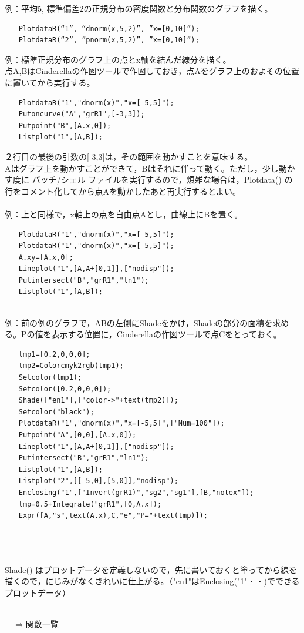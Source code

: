 \documentclass[papersize,a4paper,12pt,uplatex]{jsarticle}
\begin{document}
\begin{description}
例：平均5, 標準偏差2の正規分布の密度関数と分布関数のグラフを描く。
\begin{verbatim}
　　PlotdataR(“1”, “dnorm(x,5,2)”, ”x=[0,10]”);
　　PlotdataR(“2”, ”pnorm(x,5,2)”, ”x=[0,10]”);
\end{verbatim}

例：標準正規分布のグラフ上の点とx軸を結んだ線分を描く。\\
点A,BはCinderellaの作図ツールで作図しておき，点Aをグラフ上のおよその位置に置いてから実行する。
\begin{verbatim}
　　PlotdataR("1","dnorm(x)","x=[-5,5]");
　　Putoncurve("A","grR1",[-3,3]);
　　Putpoint("B",[A.x,0]);
　　Listplot("1",[A,B]);
\end{verbatim}
２行目の最後の引数の[-3,3]は，その範囲を動かすことを意味する。\\
Aはグラフ上を動かすことができて，Bはそれに伴って動く。ただし，少し動かす度に バッチ/シェル ファイルを実行するので，煩雑な場合は，Plotdata() の行をコメント化してから点Aを動かしたあと再実行するとよい。\\
　\\
例：上と同様で，x軸上の点を自由点Aとし，曲線上にBを置く。
\begin{verbatim}
　　PlotdataR("1","dnorm(x)","x=[-5,5]");
　　PlotdataR("1","dnorm(x)","x=[-5,5]");
　　A.xy=[A.x,0];
　　Lineplot("1",[A,A+[0,1]],["nodisp"]);
　　Putintersect("B","grR1","ln1");
　　Listplot("1",[A,B]);
\end{verbatim}
　\\
例：前の例のグラフで，ABの左側にShadeをかけ，Shadeの部分の面積を求める。Pの値を表示する位置に，Cinderellaの作図ツールで点Cをとっておく。
\begin{verbatim}
　　tmp1=[0.2,0,0,0];
　　tmp2=Colorcmyk2rgb(tmp1);
　　Setcolor(tmp1);
　　Setcolor([0.2,0,0,0]);
　　Shade(["en1"],["color->"+text(tmp2)]);
　　Setcolor("black");
　　PlotdataR("1","dnorm(x)","x=[-5,5]",["Num=100"]);
　　Putpoint("A",[0,0],[A.x,0]);
　　Lineplot("1",[A,A+[0,1]],["nodisp"]);
　　Putintersect("B","grR1","ln1");
　　Listplot("1",[A,B]);
　　Listplot("2",[[-5,0],[5,0]],"nodisp");
　　Enclosing("1",["Invert(grR1)","sg2","sg1"],[B,"notex"]);
　　tmp=0.5+Integrate("grR1",[0,A.x]);
　　Expr([A,"s",text(A.x),C,"e","P="+text(tmp)]);
\end{verbatim}
　\\
　　\\
　\\
Shade() はプロットデータを定義しないので，先に書いておくと塗ってから線を描くので，にじみがなくきれいに仕上がる。（"en1"はEnclosing("1"・・)でできるプロットデータ）\\
　\\
\begin{flushright}　\hyperlink{functionlist}{$\Rightarrow$関数一覧}\end{flushright}


\end{description}
\end{document}
